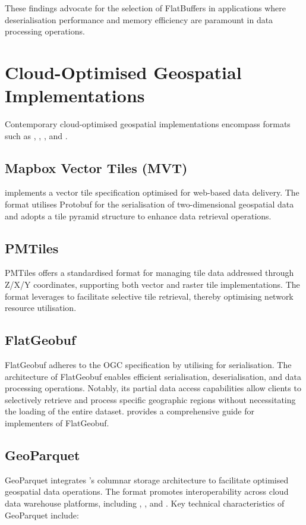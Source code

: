 These findings advocate for the selection of FlatBuffers in applications where deserialisation performance and memory efficiency are paramount in data processing operations.

\section{Cloud-Optimised Geospatial Implementations}
\label{rw:cloud_optimised_implementations}
Contemporary cloud-optimised geospatial implementations encompass formats such as \citet{mapbox-vector-tiles}, \citet{flatgeobuf}, \citet{pmtiles}, and \citet{geoparquet}.

\subsection{Mapbox Vector Tiles (MVT)}
\label{rw:cloud_optimised_implementations:mvt}
\citet{mapbox-vector-tiles} implements a vector tile specification optimised for web-based data delivery. The format utilises Protobuf for the serialisation of two-dimensional geospatial data and adopts a tile pyramid structure to enhance data retrieval operations.

\subsection{PMTiles}
\label{rw:cloud_optimised_implementations:pmtiles}
PMTiles offers a standardised format for managing tile data addressed through Z/X/Y coordinates, supporting both vector and raster tile implementations. The format leverages \citet{http_range_requests} to facilitate selective tile retrieval, thereby optimising network resource utilisation.

\subsection{FlatGeobuf}
\label{rw:cloud_optimised_implementations:flatgeobuf}
FlatGeobuf adheres to the OGC \citet{simple_features} specification by utilising \citet{flatbuffers} for serialisation. The architecture of FlatGeobuf enables efficient serialisation, deserialisation, and data processing operations. Notably, its partial data access capabilities allow clients to selectively retrieve and process specific geographic regions without necessitating the loading of the entire dataset. \citet{horance_2022_detail} provides a comprehensive guide for implementers of FlatGeobuf.

\subsection{GeoParquet}
\label{rw:cloud_optimised_implementations:geoparquet}
GeoParquet integrates \citet{parquet}'s columnar storage architecture to facilitate optimised geospatial data operations. The format promotes interoperability across cloud data warehouse platforms, including \citet{bigquery}, \citet{snowflake}, and \citet{redshift}. Key technical characteristics of GeoParquet include:

